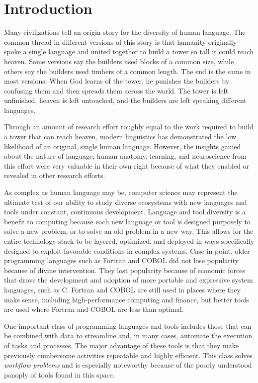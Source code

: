 \chapter{Introduction} \label{ch:introduction}

Many civilizations tell an origin story for the diversity of human language. The
common thread in different versions of this story is that humanity
originally spoke a single language and united together to build a tower so tall
it could reach heaven. Some versions say the builders used blocks of
a common size, while others say the builders used timbers of a common
length. The end is the same in most versions: When God learns of the
tower, he punishes the builders by confusing them and then spreads them across
the world. The tower is left unfinished, heaven is left untouched, and the
builders are left speaking different languages.

Through an amount of research effort roughly equal to the work required
to build a tower that can reach heaven, modern linguistics has demonstrated the
low likelihood of an original, single human language. However, the insights gained
about the nature of language, human anatomy, learning, and neuroscience from
this effort were very valuable in their own right because of what they enabled or
revealed in other research efforts.

As complex as human language may be, computer science may represent the ultimate
test of our ability to study diverse ecosystems with new languages and tools
under constant, continuous development. Language and tool diversity is a
benefit to computing because each new language or tool is designed purposely to
solve a new problem, or to solve an old problem in a new way. This allows for
the entire technology stack to  be layered, optimized, and deployed in ways
specifically designed to exploit favorable conditions in complex systems. Case
in point, older programming languages such as Fortran and COBOL did not lose
popularity because of divine intervention. They lost popularity because of
economic forces that drove the development and adoption of more portable and
expressive system languages, such as C. Fortran and COBOL are still used in
places where they make sense, including high-performance computing and finance,
but better tools are used where Fortran and COBOL are less than optimal.

One important class of programming languages and tools includes those that
can be combined with data to streamline and, in many cases, automate the
execution of tasks and processes. The major advantage of these tools is that
they make previously cumbersome activities repeatable and highly efficient.
This class solves \textit{workflow problems} and is especially noteworthy
because of the poorly understood panoply of tools found in this space.


